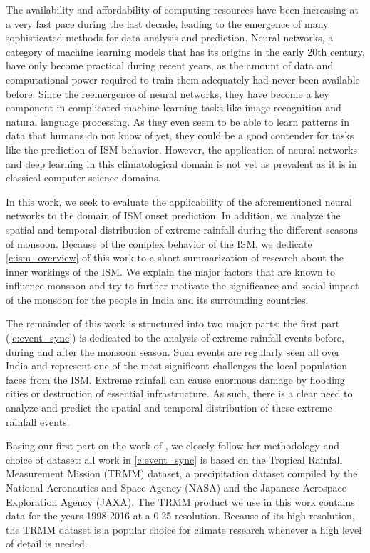 The availability and affordability of computing resources have been increasing at a very fast pace during the last decade, leading to the emergence of many sophisticated methods for data analysis and prediction. Neural networks, a category of machine learning models that has its origins in the early 20th century, have only become practical during recent years, as the amount of data and computational power required to train them adequately had never been available before. Since the reemergence of neural networks, they have become a key component in complicated machine learning tasks like image recognition and natural language processing. As they even seem to be able to learn patterns in data that humans do not know of yet, they could be a good contender for tasks like the prediction of ISM behavior. However, the application of neural networks and deep learning in this climatological domain is not yet as prevalent as it is in classical computer science domains.

In this work, we seek to evaluate the applicability of the aforementioned neural networks to the domain of ISM onset prediction. In addition, we analyze the spatial and temporal distribution of extreme rainfall during the different seasons of monsoon. Because of the complex behavior of the ISM, we dedicate \cref{c:ism_overview} of this work to a short summarization of research about the inner workings of the ISM. We explain the major factors that are known to influence monsoon and try to further motivate the significance and social impact of the monsoon for the people in India and its surrounding countries.

The remainder of this work is structured into two major parts: the first part (\cref{c:event_sync}) is dedicated to the analysis of extreme rainfall events before, during and after the monsoon season. Such events are regularly seen all over India and represent one of the most significant challenges the local population faces from the ISM. Extreme rainfall can cause enormous damage by flooding cities or destruction of essential infrastructure. As such, there is a clear need to analyze and predict the spatial and temporal distribution of these extreme rainfall events.

Basing our first part on the work of \citet{Stolbova.2015}, we closely follow her methodology and choice of dataset: all work in \cref{c:event_sync} is based on the Tropical Rainfall Measurement Mission (TRMM) dataset, a precipitation dataset compiled by the National Aeronautics and Space Agency (NASA) and the Japanese Aerospace Exploration Agency (JAXA). The TRMM product we use in this work contains data for the years 1998-2016 at a {0.25\degree} resolution. Because of its high resolution, the TRMM dataset is a popular choice for climate research whenever a high level of detail is needed.

